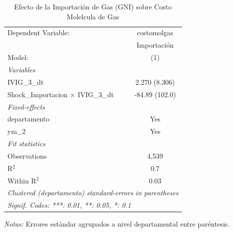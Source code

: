 \documentclass[12pt]{article}
\begin{document}
\setcounter{table}{10}
\begin{table}[htbp]
\centering
\begin{threeparttable}

   \caption{Efecto de la Importación de Gas (GNI) sobre Costo Molelcula de Gas}
   \centering
   \small
   \begin{tabular}{lc}
      \tabularnewline \midrule \midrule
      Dependent Variable:                         & costomolgas\\  
                                                  & Importación \\   
      Model:                                      & (1)\\  
      \midrule
      \emph{Variables}\\
      IVIG\_3\_dt                                 & 2.270 (8.306)\\   
      Shock\_Importacion $\times$ IVIG\_3\_dt     & -84.89 (102.0)\\   
      \midrule
      \emph{Fixed-effects}\\
      departamento                                & Yes\\  
      ym\_2                                       & Yes\\  
      \midrule
      \emph{Fit statistics}\\
      Observations                                & 4,539\\  
      R$^2$                                       & 0.7\\  
      Within R$^2$                                & 0.03\\  
      \midrule \midrule
      \multicolumn{2}{l}{\emph{Clustered (departamento) standard-errors in parentheses}}\\
      \multicolumn{2}{l}{\emph{Signif. Codes: ***: 0.01, **: 0.05, *: 0.1}}\\
   \end{tabular}


\begin{tablenotes}
\footnotesize
\item \textit{Notas:} Errores estándar agrupados a nivel departamental entre paréntesis.
\end{tablenotes}
\end{threeparttable}
\end{table}
\end{document}
